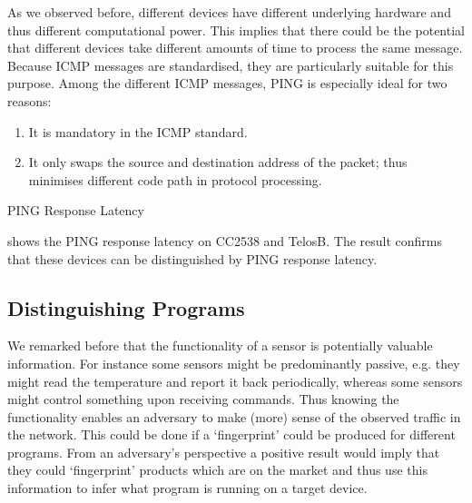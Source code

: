 \documentclass{article}
\begin{document}
As we observed before, different devices have different underlying hardware and thus different computational power. This implies that there could be the potential that different devices take different amounts of time to process the same message. Because ICMP messages are standardised, they are particularly suitable for this purpose. Among the different ICMP messages, PING is especially ideal for two reasons: 
\begin{enumerate}
	\item It is mandatory in the ICMP standard.
	\item It only swaps the source and destination address of the packet; thus minimises different code path in protocol processing.
\end{enumerate}

\begin{table}
	\center
	
	\caption{PING Response Latency\label{PingResponse}}
\end{table}

 shows the PING response latency on CC2538 and TelosB. The result confirms that these devices can be distinguished by PING response latency.


\subsection{Distinguishing Programs}

We remarked before that the functionality of a sensor is potentially valuable information. For instance some sensors might be predominantly passive, e.g. they might read the temperature and report it back periodically, whereas some sensors might control something upon receiving commands. Thus knowing the functionality enables an adversary to make (more) sense of the observed traffic in the network. This could be done if a `fingerprint' could be produced for different programs. From an adversary's perspective a positive result would imply that they could `fingerprint' products which are on the market and thus use this information to infer what program is running on a target device.
\end{document}
